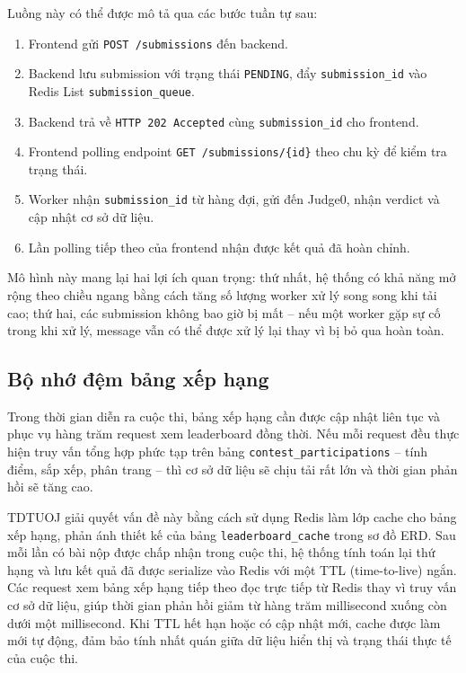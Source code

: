 \documentclass[12pt, a4paper]{report}
\begin{document}
Luồng này có thể được mô tả qua các bước tuần tự sau:

\begin{enumerate}
  \item Frontend gửi \texttt{POST /submissions} đến backend.
  \item Backend lưu submission với trạng thái \texttt{PENDING}, đẩy \texttt{submission\_id} vào Redis List \texttt{submission\_queue}.
  \item Backend trả về \texttt{HTTP 202 Accepted} cùng \texttt{submission\_id} cho frontend.
  \item Frontend polling endpoint \texttt{GET /submissions/\{id\}} theo chu kỳ để kiểm tra trạng thái.
  \item Worker nhận \texttt{submission\_id} từ hàng đợi, gửi đến Judge0, nhận verdict và cập nhật cơ sở dữ liệu.
  \item Lần polling tiếp theo của frontend nhận được kết quả đã hoàn chỉnh.
\end{enumerate}

Mô hình này mang lại hai lợi ích quan trọng: thứ nhất, hệ thống có khả năng mở rộng theo chiều ngang bằng cách tăng số lượng worker xử lý song song khi tải cao; thứ hai, các submission không bao giờ bị mất -- nếu một worker gặp sự cố trong khi xử lý, message vẫn có thể được xử lý lại thay vì bị bỏ qua hoàn toàn.

\subsection{Bộ nhớ đệm bảng xếp hạng}

Trong thời gian diễn ra cuộc thi, bảng xếp hạng cần được cập nhật liên tục và phục vụ hàng trăm request xem leaderboard đồng thời. Nếu mỗi request đều thực hiện truy vấn tổng hợp phức tạp trên bảng \texttt{contest\_participations} -- tính điểm, sắp xếp, phân trang -- thì cơ sở dữ liệu sẽ chịu tải rất lớn và thời gian phản hồi sẽ tăng cao.

TDTUOJ giải quyết vấn đề này bằng cách sử dụng Redis làm lớp cache cho bảng xếp hạng, phản ánh thiết kế của bảng \texttt{leaderboard\_cache} trong sơ đồ \ac{ERD}. Sau mỗi lần có bài nộp được chấp nhận trong cuộc thi, hệ thống tính toán lại thứ hạng và lưu kết quả đã được serialize vào Redis với một TTL (time-to-live) ngắn. Các request xem bảng xếp hạng tiếp theo đọc trực tiếp từ Redis thay vì truy vấn cơ sở dữ liệu, giúp thời gian phản hồi giảm từ hàng trăm millisecond xuống còn dưới một millisecond. Khi TTL hết hạn hoặc có cập nhật mới, cache được làm mới tự động, đảm bảo tính nhất quán giữa dữ liệu hiển thị và trạng thái thực tế của cuộc thi.
\end{document}
